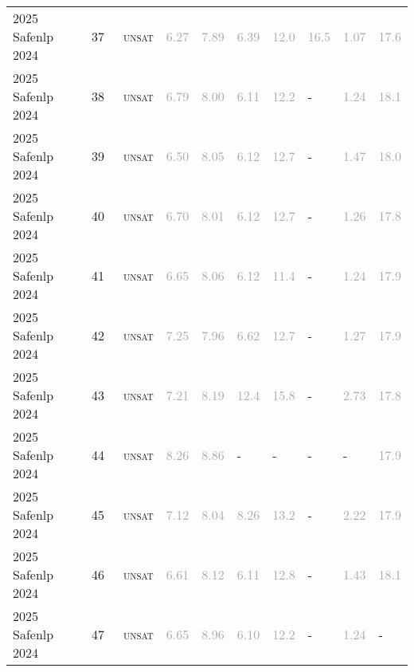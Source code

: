 \begin{center}
{\begin{longtable}{@{}llllllllll@{}}
2025 Safenlp 2024 & 37 & ~\textsc{unsat} & \textcolor{darkgray}{6.27} & \textcolor{darkgray}{7.89} & \textcolor{darkgray}{6.39} & \textcolor{darkgray}{12.0} & \textcolor{darkgray}{16.5} & \textcolor{darkgray}{1.07} & \textcolor{darkgray}{17.6} \\
2025 Safenlp 2024 & 38 & ~\textsc{unsat} & \textcolor{darkgray}{6.79} & \textcolor{darkgray}{8.00} & \textcolor{darkgray}{6.11} & \textcolor{darkgray}{12.2} & - & \textcolor{darkgray}{1.24} & \textcolor{darkgray}{18.1} \\
2025 Safenlp 2024 & 39 & ~\textsc{unsat} & \textcolor{darkgray}{6.50} & \textcolor{darkgray}{8.05} & \textcolor{darkgray}{6.12} & \textcolor{darkgray}{12.7} & - & \textcolor{darkgray}{1.47} & \textcolor{darkgray}{18.0} \\
2025 Safenlp 2024 & 40 & ~\textsc{unsat} & \textcolor{darkgray}{6.70} & \textcolor{darkgray}{8.01} & \textcolor{darkgray}{6.12} & \textcolor{darkgray}{12.7} & - & \textcolor{darkgray}{1.26} & \textcolor{darkgray}{17.8} \\
2025 Safenlp 2024 & 41 & ~\textsc{unsat} & \textcolor{darkgray}{6.65} & \textcolor{darkgray}{8.06} & \textcolor{darkgray}{6.12} & \textcolor{darkgray}{11.4} & - & \textcolor{darkgray}{1.24} & \textcolor{darkgray}{17.9} \\
2025 Safenlp 2024 & 42 & ~\textsc{unsat} & \textcolor{darkgray}{7.25} & \textcolor{darkgray}{7.96} & \textcolor{darkgray}{6.62} & \textcolor{darkgray}{12.7} & - & \textcolor{darkgray}{1.27} & \textcolor{darkgray}{17.9} \\
2025 Safenlp 2024 & 43 & ~\textsc{unsat} & \textcolor{darkgray}{7.21} & \textcolor{darkgray}{8.19} & \textcolor{darkgray}{12.4} & \textcolor{darkgray}{15.8} & - & \textcolor{darkgray}{2.73} & \textcolor{darkgray}{17.8} \\
2025 Safenlp 2024 & 44 & ~\textsc{unsat} & \textcolor{darkgray}{8.26} & \textcolor{darkgray}{8.86} & - & - & - & - & \textcolor{darkgray}{17.9} \\
2025 Safenlp 2024 & 45 & ~\textsc{unsat} & \textcolor{darkgray}{7.12} & \textcolor{darkgray}{8.04} & \textcolor{darkgray}{8.26} & \textcolor{darkgray}{13.2} & - & \textcolor{darkgray}{2.22} & \textcolor{darkgray}{17.9} \\
2025 Safenlp 2024 & 46 & ~\textsc{unsat} & \textcolor{darkgray}{6.61} & \textcolor{darkgray}{8.12} & \textcolor{darkgray}{6.11} & \textcolor{darkgray}{12.8} & - & \textcolor{darkgray}{1.43} & \textcolor{darkgray}{18.1} \\
2025 Safenlp 2024 & 47 & ~\textsc{unsat} & \textcolor{darkgray}{6.65} & \textcolor{darkgray}{8.96} & \textcolor{darkgray}{6.10} & \textcolor{darkgray}{12.2} & - & \textcolor{darkgray}{1.24} & - \\

\end{longtable}}
\end{center}

